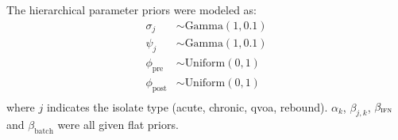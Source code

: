 \documentclass[12pt]{article}
\begin{document}
The hierarchical parameter priors were modeled as:
  \begin{align*}
    \sigma_j & \sim \text{Gamma}(1,0.1)\\
    \psi_j & \sim \text{Gamma}(1,0.1)\\
    \phi_{\text{pre}} & \sim \text{Uniform}(0,1)\\
    \phi_{\text{post}} & \sim \text{Uniform}(0,1)\\
  \end{align*}
where $j$ indicates the isolate type (acute, chronic, qvoa, rebound). $\alpha_k$, $\beta_{j,k}$, $\beta_{\text{\textsc{ifn}}}$ and $\beta_{\text{batch}}$ were all given flat priors.
\end{document}
